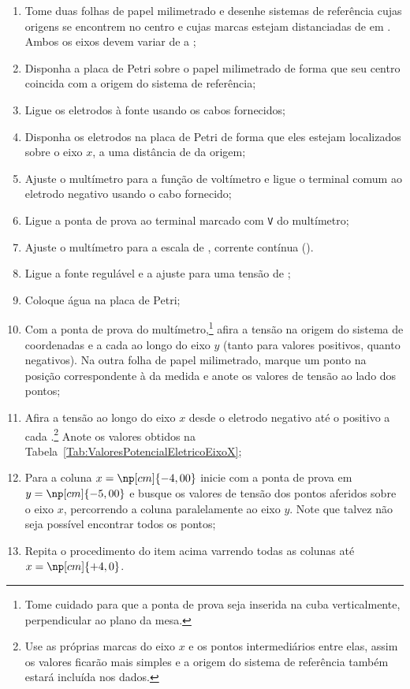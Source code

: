 \begin{enumerate}
	\item Tome duas folhas de papel milimetrado e desenhe sistemas de referência cujas origens se encontrem no centro e cujas marcas estejam distanciadas de  em . Ambos os eixos devem variar de  a ;
	\item Disponha a placa de Petri sobre o papel milimetrado de forma que seu centro coincida com a origem do sistema de referência;
	\item Ligue os eletrodos à fonte usando os cabos fornecidos;
	\item Disponha os eletrodos na placa de Petri de forma que eles estejam localizados sobre o eixo $x$, a uma distância de  da origem;
	\item Ajuste o multímetro para a função de voltímetro e ligue o terminal comum ao eletrodo negativo usando o cabo fornecido;
	\item Ligue a ponta de prova ao terminal marcado com \texttt{V} do multímetro;
	\item Ajuste o multímetro para a escala de , corrente contínua ().
	\item Ligue a fonte regulável e a ajuste para uma tensão de ;
	\item Coloque água na placa de Petri;
	\item Com a ponta de prova do multímetro,\footnote{Tome cuidado para que a ponta de prova seja inserida na cuba verticalmente, perpendicular ao plano da mesa.} afira a tensão na origem do sistema de coordenadas e a cada  ao longo do eixo $y$ (tanto para valores positivos, quanto negativos). Na outra folha de papel milimetrado, marque um ponto na posição correspondente à da medida e anote os valores de tensão ao lado dos pontos;
	\item Afira a tensão ao longo do eixo $x$ desde o eletrodo negativo até o positivo a cada .\footnote{Use as próprias marcas do eixo $x$ e os pontos intermediários entre elas, assim os valores ficarão mais simples e a origem do sistema de referência também estará incluída nos dados.} Anote os valores obtidos na Tabela~\ref{Tab:ValoresPotencialEletricoEixoX};
	\item Para a coluna $x = \np[cm]{-4,00}$ inicie com a ponta de prova em $y = \np[cm]{-5,00}$ e busque os valores de tensão dos pontos aferidos sobre o eixo $x$, percorrendo a coluna paralelamente ao eixo $y$. Note que talvez não seja possível encontrar todos os pontos;
	\item Repita o procedimento do item acima varrendo todas as colunas até $x = \np[cm]{+4,0}$.
\end{enumerate}

